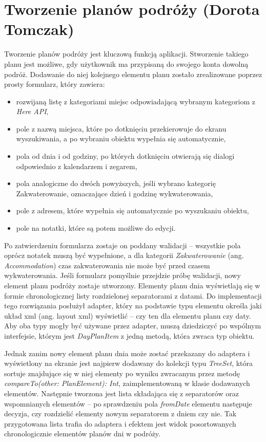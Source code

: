 \documentclass[10pt,twoside,a4paper]{report}
\begin{document}
\section{Tworzenie planów podróży (Dorota Tomczak)}
\par Tworzenie planów podróży jest kluczową funkcją aplikacji. Stworzenie takiego planu jest możliwe, gdy użytkownik ma przypisaną do swojego konta dowolną podróż. Dodawanie do niej kolejnego elementu planu zostało zrealizowane poprzez prosty formularz, który zawiera:
\begin{itemize}
\item rozwijaną listę z kategoriami miejsc odpowiadającą wybranym kategoriom z \textit{Here API}\cite{Here},
\item pole z nazwą miejsca, które po dotknięciu przekierowuje do ekranu wyszukiwania, a po wybraniu obiektu wypełnia się automatycznie,
\item pola od dnia i od godziny, po których dotknięciu otwierają się dialogi odpowiednio z kalendarzem i zegarem,
\item pola analogiczne do dwóch powyższych, jeśli wybrano kategorię Zakwaterowanie, oznaczające dzień i godzinę wykwaterowania,
\item pole z adresem, które wypełnia się automatycznie po wyszukaniu obiektu,
\item pole na notatki, które są potem możliwe do edycji.
\end{itemize}

\par Po zatwierdzeniu formularza zostaje on poddany walidacji – wszystkie pola oprócz notatek muszą być wypełnione, a dla kategorii \textit{Zakwaterowanie} (ang. \textit{Accommodation}) czas zakwaterowania nie może być przed czasem wykwaterowania. Jeśli formularz pomyślnie przejdzie próbę walidacji, nowy element planu podróży zostaje utworzony.
Elementy planu dnia wyświetlają się w formie chronologicznej listy rozdzielonej separatorami z datami. Do implementacji tego rozwiązania posłużył adapter, który na podstawie typu elementu określa jaki układ xml (ang. layout xml) wyświetlić – czy ten dla elementu planu czy daty. Aby oba typy mogły być używane przez adapter, muszą dziedziczyć po wspólnym interfejsie, którym jest \textit{DayPlanItem} z jedną metodą, która zwraca typ obiektu.
\par Jednak zanim nowy element planu dnia może zostać przekazany do adaptera i wyświetlony na ekranie jest najpierw dodawany do kolekcji typu \textit{TreeSet}, która sortuje znajdujące się w niej elementy po wyniku zwracanym przez metodę \textit{compareTo(other: PlanElement): Int}, zaimplementowaną w klasie dodawanych elementów. Następnie tworzona jest lista składająca się z separatorów oraz wspomnianych elementów – po sprawdzeniu pola \textit{fromDate} elementu następuje decyzja, czy rozdzielić elementy nowym separatorem z dniem czy nie. Tak przygotowana lista trafia do adaptera i efektem jest widok posortowanych chronologicznie elementów planów dni w podróży.
\end{document}
